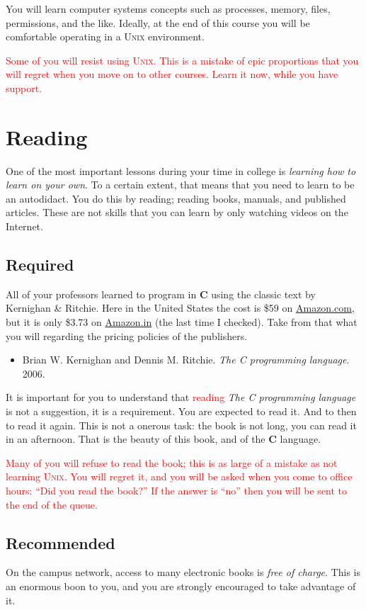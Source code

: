 \documentclass{article}
\begin{document}
You will learn computer systems concepts such as processes, memory, files,
permissions, and the like. Ideally, at the end of this course you will be
comfortable operating in a \textsc{Unix} environment.

\textcolor{red}{Some of you will resist using \textsc{Unix}. This
is a mistake of epic proportions that you will regret when you move
on to other courses. Learn it now, while you have support.}

\section{Reading}
One of the most important lessons during your time in college is
\emph{learning how to learn on your own}. To a certain extent, that
means that you need to learn to be an autodidact. You do this by
reading; reading books, manuals, and published articles. These are
not skills that you can learn by only watching videos on the Internet.

\subsection{Required}
All of your professors learned to program in \textbf{C} using the
classic text by Kernighan \& Ritchie.  Here in the United States
the cost is \$59 on \url{Amazon.com}, but it is only \$3.73 on
\url{Amazon.in} (the last time I checked).  Take from that what you
will regarding the pricing policies of the publishers.

\begin{itemize}
\item
Brian W. Kernighan and Dennis M. Ritchie. \emph{The C programming language}. 2006.
\end{itemize}

It is important for you to understand that \textcolor{red}{reading}
\emph{The C programming
language} is not a suggestion, it is a requirement. You are expected
to read it. And to then to read it again.  This is not a onerous
task: the book is not long, you can read it in an afternoon. That
is the beauty of this book, and of the \textbf{C} language.

\textcolor{red}{Many of you will refuse to read the book; this is as large of a mistake as not
learning \textsc{Unix}. You will regret it, and you will be asked when you come to office hours:
``Did you read the book?'' If the answer is ``no'' then you will be sent to the end of the queue.}
\subsection{Recommended}
On the campus network, access to many electronic books is \emph{free of
charge}. This is an enormous boon to you, and you are strongly encouraged to
take advantage of it.
\end{document}
